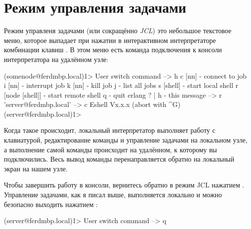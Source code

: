 \documentclass[11pt, oneside]{book}   	%
\begin{document}
\section{Режим управления задачами}
\newcommand{\Circum}{$ ^{\wedge}$}

Режим управленя задачами (или сокращённо \emph{JCL}) это небольшое текстовое меню, которое выпадает при нажатии в интерактивном интерпретаторе комбинации клавиш \command{\Circum{}G}. В этом меню есть команда подключения к консоли интерпретатора на удалённом узле:

\begin{VerbatimEshell}
(somenode@ferdmbp.local)1>
User switch command
 --> h
  c [nn]            - connect to job
  i [nn]            - interrupt job
  k [nn]            - kill job
  j                 - list all jobs
  s [shell]         - start local shell
  r [node [shell]]  - start remote shell
  q                 - quit erlang
  ? | h             - this message
 --> r 'server@ferdmbp.local'
 --> c
Eshell Vx.x.x  (abort with ^G)
(server@ferdmbp.local)1>
\end{VerbatimEshell}

Когда такое происходит, локальный интерпретатор выполняет работу с клавиатурой, редактирование команды и управление задачами на локальном узле, а выполнение самой команды происходит на удалённом, к которому вы подключились. Весь вывод команды перенаправляется обратно на локальный экран на нашем узле.

Чтобы завершить работу в консоли, вернитесь обратно в режим JCL нажатием \command{\Circum{}G}. Управление задачами, как я писал выше, выполняется локально и можно безопасно выходить нажатием \command{\Circum{}G q}:

\begin{VerbatimEshell}
(server@ferdmbp.local)1>
User switch command
 --> q
\end{VerbatimEshell}
\end{document}
